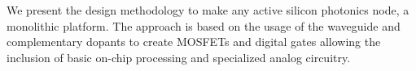 We present the design methodology to make any active silicon photonics node, a monolithic platform. 
The approach is based on the usage of the waveguide and complementary dopants to create MOSFETs and digital gates allowing the inclusion of basic on-chip processing and specialized analog circuitry.
